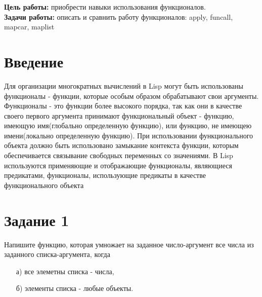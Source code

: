 \documentclass[a4paper, 12pt]{article}
\begin{document}
\tableofcontents
\clearpage
\newpage

\textbf{Цель работы:} приобрести навыки использования функционалов.
\\ \hspace*{5mm} \textbf{Задачи работы:} описать и сравнить работу функционалов: apply, funcall, mapcar, maplist


\section*{Введение}

\hspace*{5mm} Для организации многократных вычислений в Lisp могут быть использованы функционалы - функции, которые особым образом обрабатывают свои аргументы. Функционалы - это  функции более высокого порядка, так как они в качестве своего первого аргумента принимают функциональный объект - функцию, имеющую имя(глобально определенную функцию), или функцию, не имеющею имени(локально определенную функцию). При использовании функционального объекта должно быть использовано замыкание контекста функции, которым обеспечивается связывание свободных переменных со значениями. В Lisp используются применяющие и отображающие функционалы, являющиеся предикатами, функционалы, использующие предикаты в качестве функционального объекта
\clearpage
\newpage




\lstset{style=mystyle}

\section*{Задание 1}
Напишите функцию, которая умножает на заданное число-аргумент все числа из заданного списка-аргумента, когда
\begin{enumerate}
	\item[а)] все элеметны списка - числа,
	\item[б)] элементы списка - любые объекты.\\
\end{enumerate}
\end{document}
